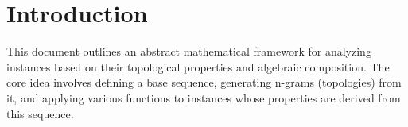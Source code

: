 \section{Introduction}
This document outlines an abstract mathematical framework for analyzing instances based on their topological properties and algebraic composition. The core idea involves defining a base sequence, generating n-grams (topologies) from it, and applying various functions to instances whose properties are derived from this sequence.